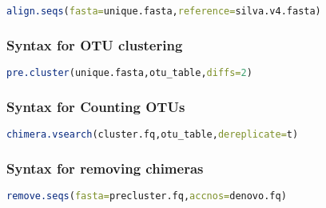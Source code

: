 \begin{lstlisting}[language=R]
align.seqs(fasta=unique.fasta,reference=silva.v4.fasta)
\end{lstlisting}


\subsubsection*{Syntax for OTU clustering}

\begin{lstlisting}[language=R]
pre.cluster(unique.fasta,otu_table,diffs=2)
\end{lstlisting}

\subsubsection*{Syntax for Counting OTUs}

\begin{lstlisting}[language=R]
chimera.vsearch(cluster.fq,otu_table,dereplicate=t)
\end{lstlisting}

\subsubsection*{Syntax for removing chimeras}

\begin{lstlisting}[language=R]
remove.seqs(fasta=precluster.fq,accnos=denovo.fq)
\end{lstlisting}